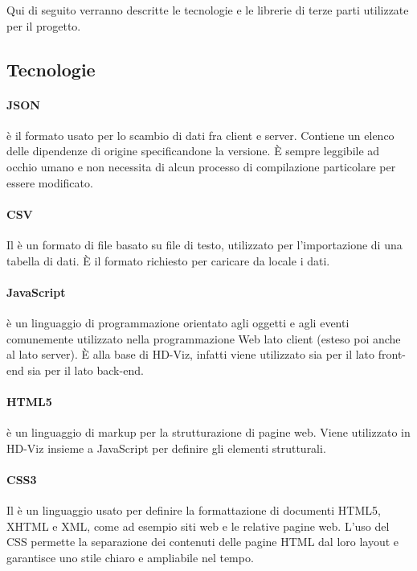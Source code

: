 \documentclass[../manuale_sviluppatore.tex]{subfiles}
\begin{document}
Qui di seguito verranno descritte le tecnologie e le librerie di terze parti utilizzate per il progetto.


\subsection{Tecnologie}

\paragraph{JSON}
 è il formato usato per lo scambio di dati fra client e server. Contiene un elenco delle dipendenze di origine specificandone la versione. 
È sempre leggibile ad occhio umano e non necessita di alcun processo di compilazione particolare per essere modificato. 

\paragraph{CSV}
Il  è un formato di file basato su file di testo, utilizzato per l’importazione di una tabella di dati. 
È il formato richiesto per caricare da locale i dati.

\paragraph{JavaScript}
 è un linguaggio di programmazione orientato agli oggetti e agli eventi comunemente utilizzato nella programmazione Web lato client (esteso poi anche al lato server). 
È alla base di HD-Viz, infatti viene utilizzato sia per il lato front-end sia per il lato back-end. 

\paragraph{HTML5}
 è un linguaggio di markup per la strutturazione di pagine web. 
Viene utilizzato in HD-Viz insieme a JavaScript per definire gli elementi strutturali.

\paragraph{CSS3}
Il  è un linguaggio usato per definire la formattazione di documenti HTML5, XHTML e XML, come ad esempio siti web e le relative pagine web. 
L’uso del CSS permette la separazione dei contenuti delle pagine HTML dal loro layout e garantisce uno stile chiaro e ampliabile nel tempo. 
\end{document}
